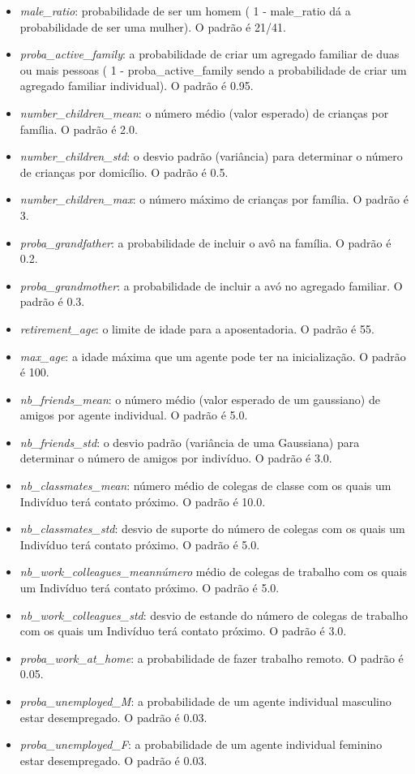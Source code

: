 \begin{itemize}
\item \textit{male\_ratio}: probabilidade de ser um homem ( 1 - male\_ratio dá a probabilidade de ser uma mulher). O padrão é 21/41.
\item \textit{proba\_active\_family}: a probabilidade de criar um agregado familiar de duas ou mais pessoas ( 1 - proba\_active\_family sendo a probabilidade de criar um agregado familiar individual). O padrão é 0.95.
\item \textit{number\_children\_mean}: o número médio (valor esperado) de crianças por família. O padrão é 2.0.
\item \textit{number\_children\_std}: o desvio padrão (variância) para determinar o número de crianças por domicílio. O padrão é 0.5.
\item \textit{number\_children\_max}: o número máximo de crianças por família. O padrão é 3.
\item \textit{proba\_grandfather}: a probabilidade de incluir o avô na família. O padrão é 0.2.
\item \textit{proba\_grandmother}: a probabilidade de incluir a avó no agregado familiar. O padrão é 0.3.
\item \textit{retirement\_age}: o limite de idade para a aposentadoria. O padrão é 55.
\item \textit{max\_age}: a idade máxima que um agente pode ter na inicialização. O padrão é 100.
\item \textit{nb\_friends\_mean}: o número médio (valor esperado de um gaussiano) de amigos por agente individual. O padrão é 5.0.
\item \textit{nb\_friends\_std}: o desvio padrão (variância de uma Gaussiana) para determinar o número de amigos por indivíduo. O padrão é 3.0.
\item \textit{nb\_classmates\_mean}: número médio de colegas de classe com os quais um Indivíduo terá contato próximo. O padrão é 10.0.
\item \textit{nb\_classmates\_std}: desvio de suporte do número de colegas com os quais um Indivíduo terá contato próximo. O padrão é 5.0.
\item \textit{nb\_work\_colleagues\_meannúmero} médio de colegas de trabalho com os quais um Indivíduo terá contato próximo. O padrão é 5.0.
\item \textit{nb\_work\_colleagues\_std}: desvio de estande do número de colegas de trabalho com os quais um Indivíduo terá contato próximo. O padrão é 3.0.
\item \textit{proba\_work\_at\_home}: a probabilidade de fazer trabalho remoto. O padrão é 0.05.
\item \textit{proba\_unemployed\_M}: a probabilidade de um agente individual masculino estar desempregado. O padrão é 0.03.
\item \textit{proba\_unemployed\_F}: a probabilidade de um agente individual feminino estar desempregado. O padrão é 0.03.
\end{itemize}

